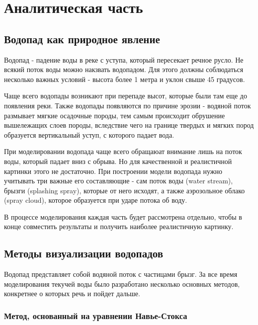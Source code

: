 \chapter{Аналитическая часть}

\section{Водопад как природное явление}

Водопад - падение воды в реке с уступа, который пересекает речное русло. Не всякий поток воды можно накзвать водопадом. Для этого должны соблюдаться несколько важных условий - высота более 1 метра и уклон свыше 45 градусов. 


Чаще всего водопады возникают при перепаде высот, которые были там еще до появления реки. 
Также водопады появляются по причине эрозии - водяной поток размывает мягкие осадочные породы, тем самым происходит обрушение вышележащих слоев породы, вследствие чего на границе твердых и мягких пород образуется вертикальный уступ, с которого падает вода.


При моделировании водопада чаще всего обращаюат внимание лишь на поток воды, который падает вниз с обрыва. Но для качественной и реалистичной картинки этого не достаточно. При построении модели водопада нужно учитывать три важные его составляющие - сам поток воды (water stream), брызги (splashing spray), которые от него исходят, а также аэрозольное облако (spray cloud), которое образуется при ударе потока об воду.

В процессе моделирования каждая часть будет рассмотрена отдельно, чтобы в конце совместить результаты и получить наиболее реалистичную картинку.

\section{Методы визуализации водопадов}

Водопад представляет собой водяной поток с частицами брызг. За все время моделирования текучей воды было разработано несколько основных методов, конкретнее о которых речь и пойдет дальше.

\subsection{Метод, основанный на уравнении Навье-Стокса}

